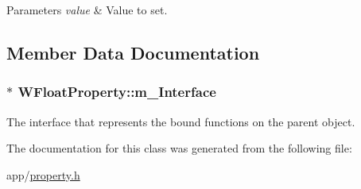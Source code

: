 \begin{DoxyParams}{Parameters}
{\em value} & Value to set. \\
\hline
\end{DoxyParams}


\subsection{Member Data Documentation}
\hypertarget{class_w_float_property_aee5767ac1ab391a1da6f396ed334e98b}{
\subsubsection[{m\-\_\-\-Interface}]{$\ast$ W\-Float\-Property\-::m\-\_\-\-Interface\hspace{0.3cm}{\ttfamily [protected]}}}\label{class_w_float_property_aee5767ac1ab391a1da6f396ed334e98b}
The interface that represents the bound functions on the parent object. 

The documentation for this class was generated from the following file\-:\begin{DoxyCompactItemize}
\item 
app/\hyperlink{property_8h}{property.\-h}\end{DoxyCompactItemize}
